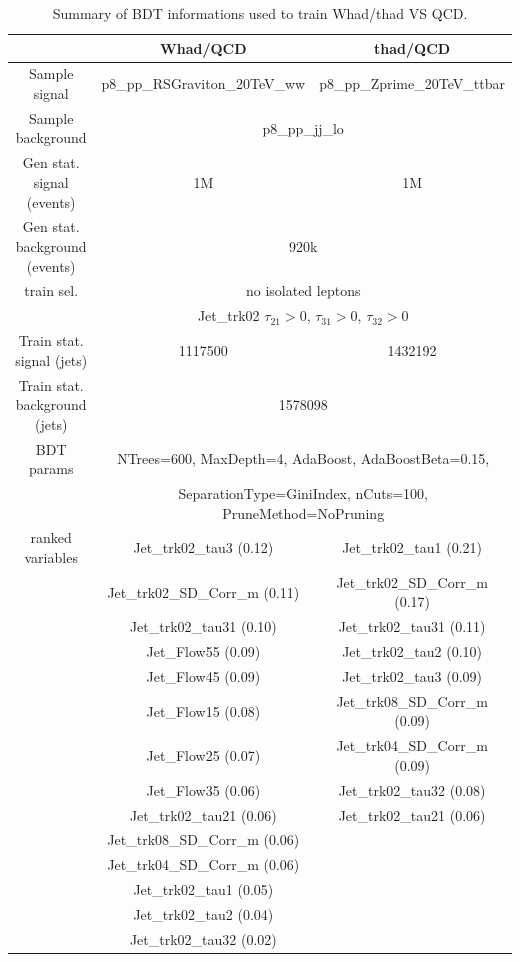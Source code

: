 \documentclass{cernrep}
\begin{document}
\begin{table}[!htb]\centering
\begin{tabular}{|c|c|c|}
\hline
\hline			
 & Whad/QCD & thad/QCD \\
\hline                        
\hline                        
Sample signal     & p8\_pp\_RSGraviton\_20TeV\_ww & p8\_pp\_Zprime\_20TeV\_ttbar \\
Sample background & \multicolumn{2}{c|}{p8\_pp\_jj\_lo} \\
\hline      
Gen stat. signal (events)     & 1M & 1M \\
Gen stat. background (events) & \multicolumn{2}{c|}{920k} \\
\hline
train sel. &  \multicolumn{2}{c|}{no isolated leptons} \\
           &  \multicolumn{2}{c|}{Jet\_trk02 $\tau_{21}>0$, $\tau_{31}>0$, $\tau_{32}>0$} \\
\hline
Train stat. signal (jets)     & 1117500 & 1432192  \\
Train stat. background (jets) & \multicolumn{2}{c|}{1578098} \\
\hline
BDT params  &  \multicolumn{2}{c|}{NTrees=600, MaxDepth=4, AdaBoost, AdaBoostBeta=0.15,} \\
            &  \multicolumn{2}{c|}{SeparationType=GiniIndex, nCuts=100, PruneMethod=NoPruning} \\
\hline
ranked variables & Jet\_trk02\_tau3 (0.12)        & Jet\_trk02\_tau1 (0.21) \\
                 & Jet\_trk02\_SD\_Corr\_m (0.11) & Jet\_trk02\_SD\_Corr\_m (0.17) \\
                 & Jet\_trk02\_tau31 (0.10)       & Jet\_trk02\_tau31 (0.11) \\
                 & Jet\_Flow55 (0.09)             & Jet\_trk02\_tau2 (0.10) \\
                 & Jet\_Flow45 (0.09)             & Jet\_trk02\_tau3 (0.09) \\
                 & Jet\_Flow15 (0.08)             & Jet\_trk08\_SD\_Corr\_m (0.09) \\
                 & Jet\_Flow25 (0.07)             & Jet\_trk04\_SD\_Corr\_m (0.09) \\
                 & Jet\_Flow35 (0.06)             & Jet\_trk02\_tau32 (0.08) \\
                 & Jet\_trk02\_tau21 (0.06)       & Jet\_trk02\_tau21 (0.06) \\
                 & Jet\_trk08\_SD\_Corr\_m (0.06) &  \\
                 & Jet\_trk04\_SD\_Corr\_m (0.06) &  \\
                 & Jet\_trk02\_tau1 (0.05)        &  \\
                 & Jet\_trk02\_tau2 (0.04)        &  \\
                 & Jet\_trk02\_tau32 (0.02)       &  \\
\hline
\hline
\end{tabular}
\caption{Summary of BDT informations used to train Whad/thad VS QCD.}
\label{tab:TMVA_summary}
\end{table}
\end{document}
